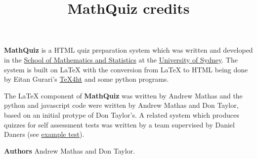 \documentclass{mathquiz}
\title{MathQuiz credits}
\newcommand{\MathQuiz}{\textbf{MathQuiz}}
\begin{document}
\begin{discussion}[Credits]
  \MathQuiz{} is a HTML quiz preparation system which was written and
   developed in the
  \href{http://www.maths.usyd.edu.au/}{School of Mathematics and Statistics}
   at the
   \href{http://www.usyd.edu.au/}{University of Sydney}. The system is built on
   \LaTeX{} with the conversion from \LaTeX{} to HTML being done by
   Eitan Gurari's
  \href{http://www.cis.ohio-state.edu/~gurari/TeX4ht/mn.html}{TeX4ht}
    and some python programs.

    \quad\newline
   The \LaTeX{} component of \MathQuiz{} was written by Andrew Mathas and the python
   and javascript code were written by Andrew Mathas and Don Taylor, based on an
   initial protype of Don Taylor's. A related system which produces quizzes for self
   assessment tests was written by a team supervised by Daniel Daners (see
   \href{http://www.maths.usyd.edu.au:8000/us/selftest.cgi}{example test}).

   \quad\newline

    \textbf{Authors}\newline
    Andrew Mathas and Don Taylor.
\end{discussion}
\end{document}
